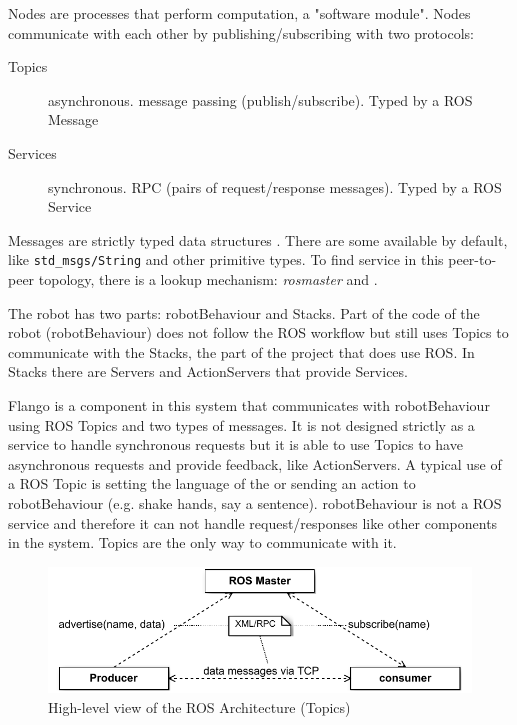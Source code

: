 Nodes are processes that perform computation, a "software module". 
Nodes communicate with each other by publishing/subscribing with two protocols:
\begin{description}
\item[Topics] asynchronous. message passing (publish/subscribe). Typed by a \ac{ROS} Message
\item[Services] synchronous. \ac{RPC} (pairs of request/response messages). Typed by a \ac{ROS} Service
\end{description}

Messages are strictly typed data structures . There are some available by default, like \texttt{std\_msgs/String} and other primitive types.
To find service in this peer-to-peer topology, there is a lookup mechanism: \emph{rosmaster}  and .

The robot has two parts: robotBehaviour and Stacks.
Part of the code of the robot (robotBehaviour) does not follow the \ac{ROS} workflow but still uses Topics to communicate with the Stacks, the part of the project that does use \ac{ROS}.
In Stacks there are Servers and ActionServers that provide Services.

Flango \cm is a component in this system that communicates with robotBehaviour using \ac{ROS} Topics and two types of messages.
It is not designed strictly as a service to handle synchronous requests but it is able to use Topics to have asynchronous requests and provide feedback, like ActionServers.
A typical use of a \ac{ROS} Topic is setting the language of the \cm or sending an action to robotBehaviour (e.g. shake hands, say a sentence).
robotBehaviour is not a \ac{ROS} service and therefore it can not handle request/responses like other components in the system.
Topics are the only way to communicate with it.

\begin{figure}[htb]
    \centering
    \includegraphics{figures/design/ros-architecture-topics.pdf}
    \caption{High-level view of the ROS Architecture (Topics)}
    \label{fig:design-ros-topics}
\end{figure}

